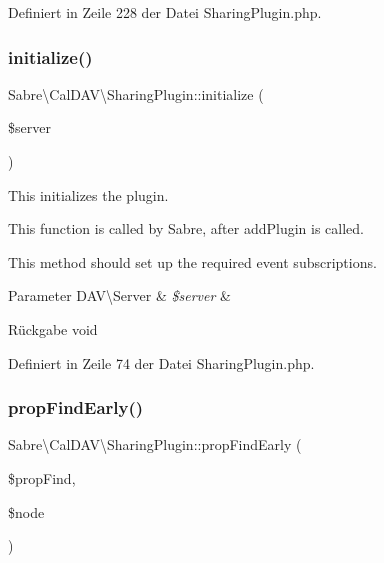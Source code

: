 Definiert in Zeile 228 der Datei Sharing\+Plugin.\+php.

\mbox{\label{class_sabre_1_1_cal_d_a_v_1_1_sharing_plugin_aac2f382d65ac97439e5d2ffdecad3866}} 
\subsubsection{\texorpdfstring{initialize()}{initialize()}}
{\footnotesize\ttfamily Sabre\textbackslash{}\+Cal\+D\+A\+V\textbackslash{}\+Sharing\+Plugin\+::initialize (\begin{DoxyParamCaption}\item[{\mbox{\hyperlink{class_sabre_1_1_d_a_v_1_1_server}{D\+A\+V\textbackslash{}\+Server}}}]{\$server }\end{DoxyParamCaption})}

This initializes the plugin.

This function is called by Sabre, after add\+Plugin is called.

This method should set up the required event subscriptions.


\begin{DoxyParams}[1]{Parameter}
D\+A\+V\textbackslash{}\+Server & {\em \$server} & \\
\hline
\end{DoxyParams}
\begin{DoxyReturn}{Rückgabe}
void 
\end{DoxyReturn}


Definiert in Zeile 74 der Datei Sharing\+Plugin.\+php.

\mbox{\label{class_sabre_1_1_cal_d_a_v_1_1_sharing_plugin_a1b9cebb0c83ae34821f5b6c4aec35ec0}} 
\subsubsection{\texorpdfstring{prop\+Find\+Early()}{propFindEarly()}}
{\footnotesize\ttfamily Sabre\textbackslash{}\+Cal\+D\+A\+V\textbackslash{}\+Sharing\+Plugin\+::prop\+Find\+Early (\begin{DoxyParamCaption}\item[{\mbox{\hyperlink{class_sabre_1_1_d_a_v_1_1_prop_find}{D\+A\+V\textbackslash{}\+Prop\+Find}}}]{\$prop\+Find,  }\item[{\mbox{\hyperlink{interface_sabre_1_1_d_a_v_1_1_i_node}{D\+A\+V\textbackslash{}\+I\+Node}}}]{\$node }\end{DoxyParamCaption})}

